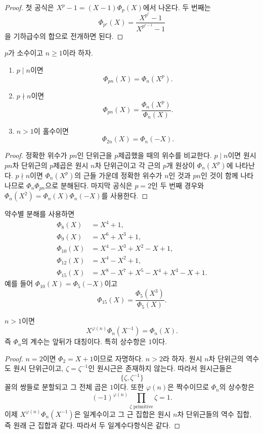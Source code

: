 \begin{proof}
첫 공식은 $X^p-1=(X-1)\Phi_p(X)$에서 나온다. 두 번째는
\[
  \Phi_{p^r}(X)
  =\frac{X^{p^r}-1}{X^{p^{r-1}}-1}
\]
을 기하급수의 합으로 전개하면 된다.
\end{proof}

\begin{proposition}
\label{prop:cyclotomic-prime-extension}
$p$가 소수이고 $n\ge1$이라 하자.
\begin{enumerate}[label=(\roman*)]
  \item $p\mid n$이면
  \[
    \Phi_{pn}(X)=\Phi_n(X^p).
  \]
  \item $p\nmid n$이면
  \[
    \Phi_{pn}(X)=\frac{\Phi_n(X^p)}{\Phi_n(X)}.
  \]
  \item $n>1$이 홀수이면
  \[
    \Phi_{2n}(X)=\Phi_n(-X).
  \]
\end{enumerate}
\end{proposition}

\begin{proof}
정확한 위수가 $pn$인 단위근을 $p$제곱했을 때의 위수를 비교한다. $p\mid n$이면 원시 $pn$차 단위근의 $p$제곱은 원시 $n$차 단위근이고 각 근의 $p$개 원상이 $\Phi_n(X^p)$에 나타난다. $p\nmid n$이면 $\Phi_n(X^p)$의 근들 가운데 정확한 위수가 $n$인 것과 $pn$인 것이 함께 나타나므로 $\Phi_n\Phi_{pn}$으로 분해된다. 마지막 공식은 $p=2$인 두 번째 경우와 $\Phi_n(X^2)=\Phi_n(X)\Phi_n(-X)$를 사용한다.
\end{proof}

\begin{example}
약수별 분해를 사용하면
\[
\begin{aligned}
  \Phi_8(X)&=X^4+1,\\
  \Phi_9(X)&=X^6+X^3+1,\\
  \Phi_{10}(X)&=X^4-X^3+X^2-X+1,\\
  \Phi_{12}(X)&=X^4-X^2+1,\\
  \Phi_{15}(X)&=X^8-X^7+X^5-X^4+X^3-X+1.
\end{aligned}
\]
예를 들어 $\Phi_{10}(X)=\Phi_5(-X)$이고
\[
  \Phi_{15}(X)=\frac{\Phi_5(X^3)}{\Phi_5(X)}.
\]
\end{example}

\begin{proposition}[상반성]
\label{prop:cyclotomic-reciprocal}
$n>1$이면
\[
  X^{\varphi(n)}\Phi_n(X^{-1})=\Phi_n(X).
\]
즉 $\Phi_n$의 계수는 앞뒤가 대칭이다. 특히 상수항은 $1$이다.
\end{proposition}

\begin{proof}
$n=2$이면 $\Phi_2=X+1$이므로 자명하다. $n>2$라 하자. 원시 $n$차 단위근의 역수도 원시 단위근이고, $\zeta=\zeta^{-1}$인 원시근은 존재하지 않는다. 따라서 원시근들은
\[
  \{\zeta,\zeta^{-1}\}
\]
꼴의 쌍들로 분할되고 그 전체 곱은 $1$이다. 또한 $\varphi(n)$은 짝수이므로 $\Phi_n$의 상수항은
\[
  (-1)^{\varphi(n)}
  \prod_{\zeta\text{ primitive}}\zeta=1.
\]
이제 $X^{\varphi(n)}\Phi_n(X^{-1})$은 일계수이고 그 근 집합은 원시 $n$차 단위근들의 역수 집합, 즉 원래 근 집합과 같다. 따라서 두 일계수다항식은 같다.
\end{proof}

